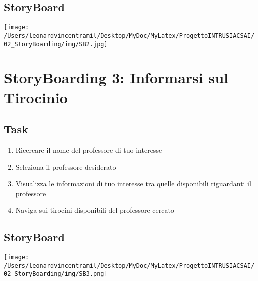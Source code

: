 \subsection{StoryBoard}
\begin{center}
    \texttt{[image: /Users/leonardvincentramil/Desktop/MyDoc/MyLatex/ProgettoINTRUSIACSAI/02\_StoryBoarding/img/SB2.jpg]}
\end{center}


\section{StoryBoarding 3: Informarsi sul Tirocinio}

\subsection{Task}
\begin{enumerate}
    \item Ricercare il nome del professore di tuo interesse
    \item Seleziona il professore desiderato
    \item Visualizza le informazioni di tuo interesse tra quelle disponibili riguardanti il professore
    \item Naviga sui tirocini disponibili del professore cercato
\end{enumerate} 

\subsection{StoryBoard}
\begin{center}
    \texttt{[image: /Users/leonardvincentramil/Desktop/MyDoc/MyLatex/ProgettoINTRUSIACSAI/02\_StoryBoarding/img/SB3.png]}
\end{center}
